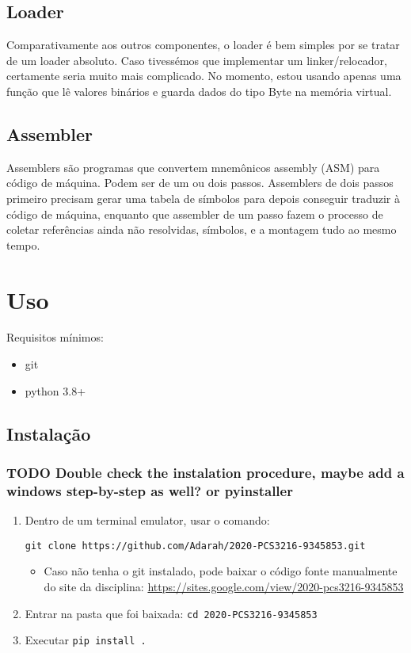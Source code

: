 \documentclass[11pt]{article}
\begin{document}
\subsection{Loader}
\label{sec:org34ce5fd}
Comparativamente aos outros componentes, o loader é bem simples por se tratar de um loader absoluto. Caso tivessémos que implementar um linker/relocador, certamente seria muito mais complicado. No momento, estou usando apenas uma função que lê valores binários e guarda dados do tipo Byte na memória virtual.
\subsection{Assembler}
\label{sec:org0508c30}
Assemblers são programas que convertem mnemônicos assembly (ASM) para código de máquina. Podem ser de um ou dois passos. Assemblers de dois passos primeiro precisam gerar uma tabela de símbolos para depois conseguir traduzir à código de máquina, enquanto que assembler de um passo fazem o processo de coletar referências ainda não resolvidas, símbolos, e a montagem tudo ao mesmo tempo.

\section{Uso}
\label{sec:org1871881}
Requisitos mínimos:
\begin{itemize}
\item git
\item python 3.8+
\end{itemize}
\subsection{Instalação}
\label{sec:org49302b5}
\subsubsection{{\bfseries\sffamily TODO} Double check the instalation procedure, maybe add a windows step-by-step as well? or pyinstaller}
\label{sec:orgccabc74}

\begin{enumerate}
\item Dentro de um terminal emulator, usar o comando:

\texttt{git clone https://github.com/Adarah/2020-PCS3216-9345853.git}
\begin{itemize}
\item Caso não tenha o git instalado, pode baixar o código fonte manualmente do site da disciplina:
\url{https://sites.google.com/view/2020-pcs3216-9345853}
\end{itemize}
\item Entrar na pasta que foi baixada: \texttt{cd 2020-PCS3216-9345853}
\item Executar \texttt{pip install .}
\end{enumerate}
\end{document}
